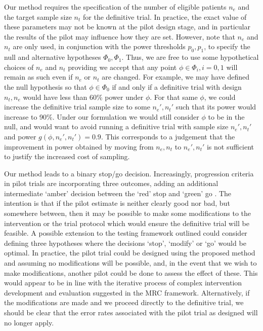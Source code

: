 \documentclass[AMA,STIX1COL]{WileyNJD-v2}
\begin{document}

Our method requires the specification of the number of eligible patients $n_e$ and the target sample size $n_t$ for the definitive trial. In practice, the exact value of these parameters may not be known at the pilot design stage, and in particular the results of the pilot may influence how they are set. However, note that $n_e$ and $n_t$ are only used, in conjunction with the power thresholds $p_0, p_1$, to specify the null and alternative hypotheses $\Phi_0, \Phi_1$. Thus, we are free to use some hypothetical choices of $n_e$ and $n_t$ providing we accept that any point $\phi \in \Phi_i, i=0,1$ will remain as such even if $n_e$ or $n_t$ are changed. For example, we may have defined the null hypothesis so that $\phi \in \Phi_0$ if and only if a definitive trial with design $n_t, n_e$ would have less than 60\% power under $\phi$. For that same $\phi$, we could increase the definitive trial sample size to some $n_e', n_t'$ such that its power would increase to 90\%. Under our formulation we would still consider $\phi$ to be in the null, and would want to avoid running a definitive trial with sample size $n_e', n_t'$ and power $g(\phi, n_e', n_t') = 0.9$. This corresponds to a judgement that the improvement in power obtained by moving from $n_e, n_t$ to $n_e', n_t'$ is not sufficient to justify the increased cost of sampling. 


Our method leads to a binary stop/go decision. Increasingly, progression criteria in pilot trials are incorporating three outcomes, adding an additional intermediate `amber' decision between the `red' stop and `green' go \cite{Avery2017}. The intention is that if the pilot estimate is neither clearly good nor bad, but somewhere between, then it may be possible to make some modifications to the intervention or the trial protocol which would ensure the definitive trial will be feasible. A possible extension to the testing framework outlined could consider defining three hypotheses where the decisions `stop', `modify' or `go' would be optimal. In practice, the pilot trial could be designed using the proposed method and assuming no modifications will be possible, and, in the event that we wish to make modifications, another pilot could be done to assess the effect of these. This would appear to be in line with the iterative process of complex intervention development and evaluation suggested in the MRC framework\cite{Craig2008}. %
 Alternatively, if the modifications are made and we proceed directly to the definitive trial, we should be clear that the error rates associated with the pilot trial as designed will no longer apply.
\end{document}
